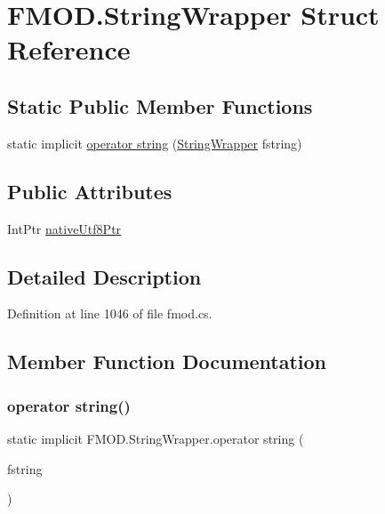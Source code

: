 \hypertarget{struct_f_m_o_d_1_1_string_wrapper}{}\section{F\+M\+O\+D.\+String\+Wrapper Struct Reference}
\label{struct_f_m_o_d_1_1_string_wrapper}
\subsection*{Static Public Member Functions}
\begin{DoxyCompactItemize}
\item 
static implicit \hyperlink{struct_f_m_o_d_1_1_string_wrapper_a0cebc43d0eb17e20a0ff54aab682fb01}{operator string} (\hyperlink{struct_f_m_o_d_1_1_string_wrapper}{String\+Wrapper} fstring)
\end{DoxyCompactItemize}
\subsection*{Public Attributes}
\begin{DoxyCompactItemize}
\item 
Int\+Ptr \hyperlink{struct_f_m_o_d_1_1_string_wrapper_ad1f3b3d96cb7ea8ced9d56d6d47aaf97}{native\+Utf8\+Ptr}
\end{DoxyCompactItemize}


\subsection{Detailed Description}


Definition at line 1046 of file fmod.\+cs.



\subsection{Member Function Documentation}
\mbox{\label{struct_f_m_o_d_1_1_string_wrapper_a0cebc43d0eb17e20a0ff54aab682fb01}} 
\subsubsection{\texorpdfstring{operator string()}{operator string()}}
{\footnotesize\ttfamily static implicit F\+M\+O\+D.\+String\+Wrapper.\+operator string (\begin{DoxyParamCaption}\item[{\hyperlink{struct_f_m_o_d_1_1_string_wrapper}{String\+Wrapper}}]{fstring }\end{DoxyParamCaption})\hspace{0.3cm}{\ttfamily [static]}}



